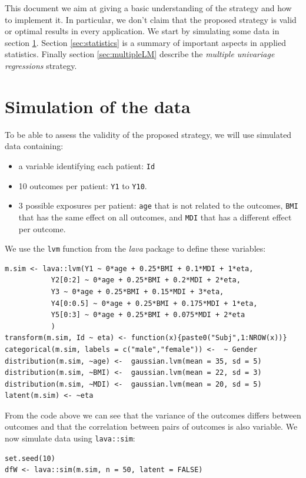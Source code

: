 \documentclass[12pt]{article}
\begin{document}
\bigskip

This document we aim at giving a basic understanding of the strategy
  and how to implement it. In particular, we don't claim that the
  proposed strategy is valid or optimal results in every
  application. We start by simulating some data in section
  \ref{sec:simulation}. Section \ref{sec:statistics} is a summary of important
  aspects in applied statistics. Finally section \ref{sec:multipleLM}
  describe the \emph{multiple univariage regressions} strategy.

\clearpage

\section{Simulation of the data}
\label{sec:simulation}
To be able to assess the validity of the proposed strategy, we will
use simulated data containing:
\begin{itemize}
\item a variable identifying each patient: \texttt{Id}
\item 10 outcomes per patient: \texttt{Y1} to \texttt{Y10}.
\item 3 possible exposures per patient: \texttt{age} that is not related to the outcomes, \texttt{BMI}
that has the same effect on all outcomes, and \texttt{MDI} that has a
different effect per outcome.
\end{itemize}
We use the \texttt{lvm} function from the \emph{lava} package to define these variables:
\lstset{language=r,label= ,caption= ,captionpos=b,numbers=none}
\begin{lstlisting}
m.sim <- lava::lvm(Y1 ~ 0*age + 0.25*BMI + 0.1*MDI + 1*eta,
		   Y2[0:2] ~ 0*age + 0.25*BMI + 0.2*MDI + 2*eta,
		   Y3 ~ 0*age + 0.25*BMI + 0.15*MDI + 3*eta,
		   Y4[0:0.5] ~ 0*age + 0.25*BMI + 0.175*MDI + 1*eta,
		   Y5[0:3] ~ 0*age + 0.25*BMI + 0.075*MDI + 2*eta 
		   )
transform(m.sim, Id ~ eta) <- function(x){paste0("Subj",1:NROW(x))}
categorical(m.sim, labels = c("male","female")) <-  ~ Gender
distribution(m.sim, ~age) <-  gaussian.lvm(mean = 35, sd = 5)
distribution(m.sim, ~BMI) <-  gaussian.lvm(mean = 22, sd = 3)
distribution(m.sim, ~MDI) <-  gaussian.lvm(mean = 20, sd = 5)
latent(m.sim) <- ~eta
\end{lstlisting}

From the code above we can see that the variance of the outcomes
 differs between outcomes and that the correlation between pairs of
 outcomes is also variable. We now simulate data using \texttt{lava::sim}:
\lstset{language=r,label= ,caption= ,captionpos=b,numbers=none}
\begin{lstlisting}
set.seed(10)
dfW <- lava::sim(m.sim, n = 50, latent = FALSE)
\end{lstlisting}
\end{document}
